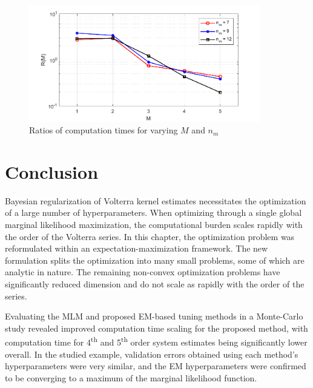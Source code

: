 \begin{figure}[h]
\centering
\includegraphics[width = 0.9\textwidth]{Chapter4_EM/Ratios_revised2.pdf}
\caption{Ratios of computation times for varying $M$ and $n_m$}
\label{fig:TimeRatio_EM}
\end{figure}

\section{Conclusion}

Bayesian regularization of Volterra kernel estimates necessitates the optimization of a large number of hyperparameters. When optimizing through a single global marginal likelihood maximization, the computational burden scales rapidly with the order of the Volterra series. In this chapter, the optimization problem was reformulated within an expectation-maximization framework. The new formulation splits the optimization into many small problems, some of which are analytic in nature. The remaining non-convex optimization problems have significantly reduced dimension and do not scale as rapidly with the order of the series. 

Evaluating the MLM and proposed EM-based tuning methods in a Monte-Carlo study revealed improved computation time scaling for the proposed method, with computation time for 4\textsuperscript{th} and 5\textsuperscript{th} order system estimates being significantly lower overall. In the studied example, validation errors obtained using each method's hyperparameters were very similar, and the EM hyperparameters were confirmed to be converging to a maximum of the marginal likelihood function. 